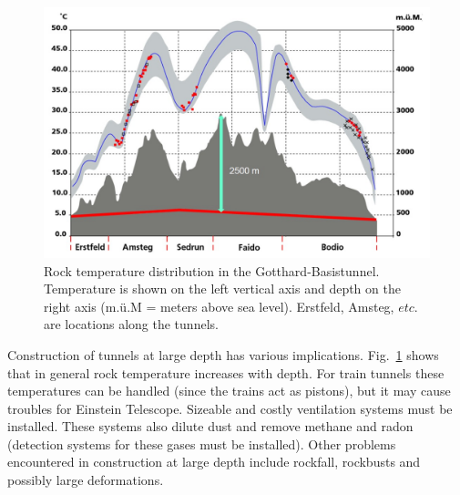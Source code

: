 \begin{figure}[htbp!]
\centering
\includegraphics[width=14cm]{./Sec_SiteInfra/Figures/rocktemp.jpg}
\caption{Rock temperature distribution in the Gotthard-Basistunnel.
Temperature is shown on the left vertical axis and depth on the right axis
(m.\"u.M = meters above sea level). Erstfeld, Amsteg, $etc.$ are locations
along the tunnels.}
\label{fig:rocktemp}
\end{figure}
Construction of tunnels at large depth has various implications. Fig.~\ref{fig:rocktemp}
shows that in general rock temperature increases with depth. For train tunnels
these temperatures can be handled (since the trains act as pistons), but it may
cause troubles for Einstein Telescope. Sizeable and costly ventilation systems must be installed. These
systems also dilute dust and remove methane and radon (detection systems
for these gases must be installed). Other problems encountered in construction
at large depth include rockfall, rockbusts and possibly large deformations.

